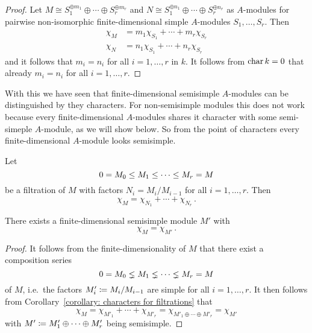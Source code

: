 \begin{proof}
  Let $M \cong S_1^{\oplus m_1} \oplus \dotsb \oplus S_r^{\oplus m_r}$ and $N \cong S_1^{\oplus n_1} \oplus \dotsb \oplus S_r^{\oplus n_r}$ as $A$-modules for pairwise non-isomorphic finite-dimensional simple $A$-modules $S_1, \dotsc, S_r$.
  Then
  \begin{align*}
    \chi_M &= m_1 \chi_{S_1} + \dotsb + m_r \chi_{S_r}  \\
    \chi_N &= n_1 \chi_{S_1} + \dotsb + n_r \chi_{S_r}
  \end{align*}
  and it follows that $m_i = n_i$ for all $i = 1, \dotsc, r$ in $k$.
  It follows from $\operatorname{char} k = 0$ that already $m_i = n_i$ for all $i = 1, \dotsc, r$.
\end{proof}


\begin{fluff}
  With this we have seen that finite-dimensional semisimple $A$-modules can be distinguished by they characters.
  For non-semisimple modules this does not work because every finite-dimensional $A$-modules shares it character with some semi-simeple $A$-module, as we will show below.
  So from the point of characters every finite-dimensional $A$-module looks semisimple.
\end{fluff}


\begin{corollary}
  \label{corollary: characters for filtrations}
  Let
  \[
                0
    =           M_0
    \leq  M_1
    \leq  \dotsb
    \leq  M_r
    =           M
  \]
  be a filtration of $M$ with factors $N_i = M_i/M_{i-1}$ for all $i = 1, \dotsc, r$.
  Then
  \[
      \chi_M
    = \chi_{N_1} + \dotsb + \chi_{N_r} \,.
  \]
\end{corollary}


\begin{corollary}
  There exists a finite-dimensional semisimple module $M'$ with
  \[
    \chi_M = \chi_{M'} \,.
  \]
\end{corollary}


\begin{proof}
  It follows from the finite-dimensionality of $M$ that there exist a composition series
  \[
                  0
    =             M_0
    \lneq   M_1
    \lneq   \dotsb
    \lneq   M_r
    =             M
  \]
  of $M$, i.e.\ the factors $M'_i \coloneqq M_i/M_{i-1}$ are simple for all $i = 1, \dotsc, r$.
  It then follows from Corollary~\ref{corollary: characters for filtrations} that
  \[
      \chi_M
    = \chi_{M'_1} + \dotsb + \chi_{M'_r}
    = \chi_{M'_1 \oplus \dotsb \oplus M'_r}
    = \chi_{M'}
  \]
  with $M' \coloneqq M'_1 \oplus \dotsb \oplus M'_r$ being semisimple.
\end{proof}





